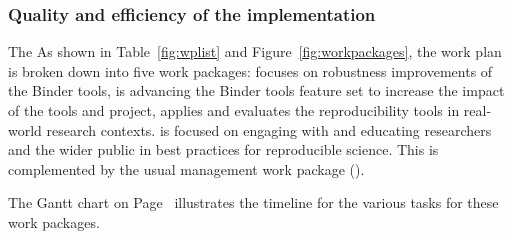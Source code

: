 

\subsubsection{Quality and efficiency of the implementation}\label{sec:workplan-structure}

\ifgrantagreement The \else As shown in Table~\ref{fig:wplist} and
Figure~\ref{fig:workpackages}, the \fi work plan is broken down into five work
packages:  focuses on robustness improvements of the
Binder tools,  is advancing the Binder tools feature set to
increase the impact of the tools and project,  applies and
evaluates the reproducibility tools in real-world research contexts.
 is focused on engaging with and educating researchers and the
wider public in best practices for reproducible science. This is complemented by
the usual management work package ().


 The Gantt chart on
Page~\pageref{fig:gantt} illustrates the timeline for the various tasks for
these work packages.

\ifgrantagreement\else
\wpfigstyle{\footnotesize\def\tabcolsep{3.5pt}}
{\wpfig}
\fi

